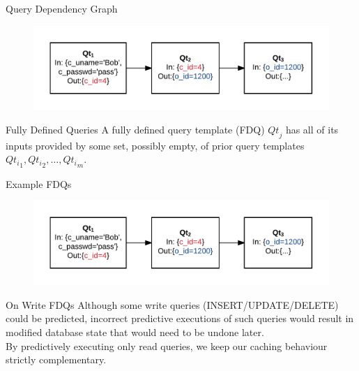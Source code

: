 \documentclass[10pt]{beamer}
\begin{document}
\begin{frame}[fragile]{Query Dependency Graph}
    \begin{figure}
        \includegraphics[scale=0.22]{apollo_query_pipeline}
    \end{figure}
\end{frame}

\begin{frame}[fragile]{Fully Defined Queries}
A \alert{fully defined query template} (FDQ) $\mathit{Qt}_j$ has all of its inputs provided
by some set, possibly empty, of prior query templates $\mathit{Qt_i}_1, \mathit{Qt_i}_2, \ldots, \mathit{Qt_i}_m$.
\end{frame}

\begin{frame}[fragile]{Example FDQs}
    \begin{figure}
        \includegraphics[scale=0.22]{apollo_query_pipeline}
    \end{figure}
\end{frame}

\begin{frame}[fragile]{On Write FDQs}
    Although some write queries (INSERT/UPDATE/DELETE) \alert{could} be predicted, incorrect predictive executions of such queries would result
    in modified database state that would need to be undone later.\\

    By predictively executing only read queries, we keep our caching behaviour \alert{strictly complementary}.
\end{frame}
\end{document}
